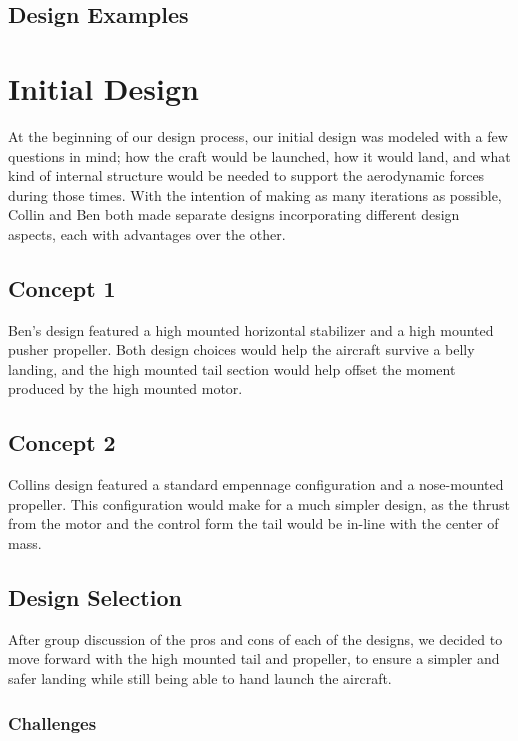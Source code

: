\documentclass[letterpaper,12pt]{article}
\begin{document}
\subsection{Design Examples}


\section{Initial Design}\label{sec:init}
At the beginning of our design process, our initial design was modeled with a few questions in mind; how the craft would be launched, how it would land, and what kind of internal structure would be needed to support the aerodynamic forces during those times. With the intention of making as many iterations as possible, Collin and Ben both made separate designs incorporating different design aspects, each with advantages over the other.   

\subsection{Concept 1}\label{sec:init:1}
Ben's design featured a high mounted horizontal stabilizer and a high mounted pusher propeller. Both design choices would help the aircraft survive a belly landing, and the high mounted tail section would help offset the moment produced by the high mounted motor.

\subsection{Concept 2}\label{sec:init:2}
Collins design featured a standard empennage configuration and a nose-mounted propeller. This configuration would make for a much simpler design, as the thrust from the motor and the control form the tail would be in-line with the center of mass. 

\subsection{Design Selection}\label{sec:init:sel}
After group discussion of the pros and cons of each of the designs, we decided to move forward with the high mounted tail and propeller, to ensure a simpler and safer landing while still being able to hand launch the aircraft. 

\subsubsection{Challenges}
\end{document}
